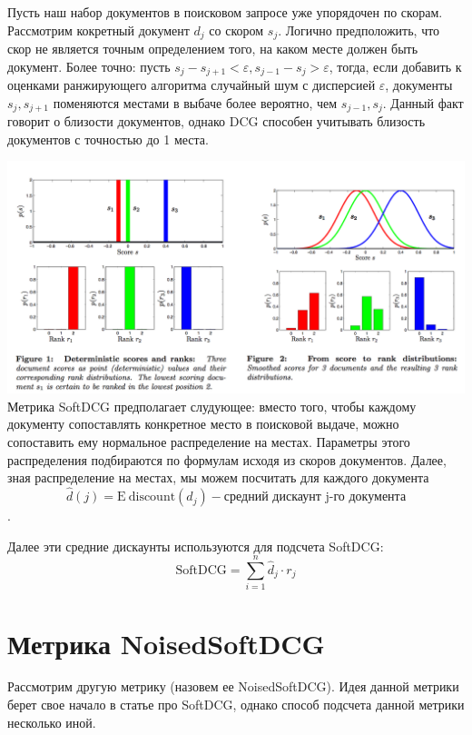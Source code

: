 \documentclass[14pt,a4paper]{amsart}
\theoremstyle{definition}
\theoremstyle{definition}
\newcommand{\E}{\mathrm{E}}
\newcommand{\Sum}{\sum\limits}
\renewcommand\t{\text}
\begin{document}
Пусть наш набор документов в поисковом запросе уже упорядочен по скорам. Рассмотрим кокретный документ $d_j$ со скором $s_j$. Логично предположить, что скор не является точным определением того, на каком месте должен быть документ. Более точно: пусть ${s_j - s_{j + 1} < \varepsilon, s_{j - 1} - s_j > \varepsilon}$, тогда, если добавить к оценками ранжирующего алгоритма случайный шум с дисперсией $\varepsilon$, документы $s_j, s_{j+1}$ поменяются местами в выбаче более вероятно, чем $s_{j-1}, s_j$. Данный факт говорит о близости документов, однако DCG способен учитывать близость документов с точностью до 1 места.

\hspace*{-0.7cm}\includegraphics[width=\textwidth]{SoftDCG} \\

Метрика SoftDCG предполагает слудующее: вместо того, чтобы каждому документу сопоставлять конкретное место в поисковой выдаче, можно сопоставить ему нормальное распределение на местах. Параметры этого распределения подбираются по формулам исходя из скоров документов. Далее, зная распределение на местах, мы можем посчитать для каждого документа $$\hat{d}(j) = \E ~ \t{discount}(d_j) - \t{средний дискаунт j-го документа}$$.

Далее эти средние дискаунты используются для подсчета SoftDCG: $$\t{SoftDCG} = \Sum_{i=1}^n \hat{d}_j \cdot r_j$$


\newpage
\section{Метрика NoisedSoftDCG}

Рассмотрим другую метрику (назовем ее NoisedSoftDCG). Идея данной метрики берет свое начало в статье про SoftDCG, однако способ подсчета данной метрики несколько иной. \\
\end{document}
